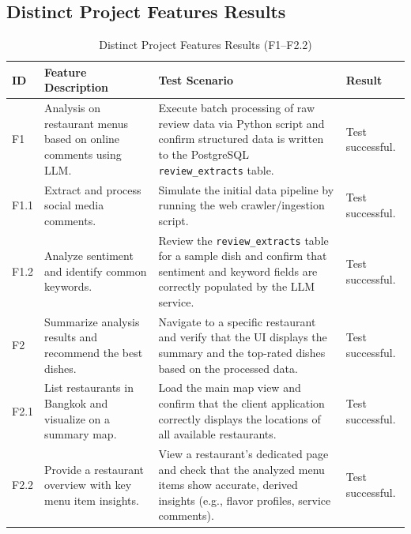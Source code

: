\subsection{Distinct Project Features Results}
\begin{table}[H]
	\centering
	\caption{Distinct Project Features Results (F1--F2.2)}
	\label{tab:distinct-features-results}
	{\small\setlength{\tabcolsep}{4pt}
	\begin{tabularx}{\textwidth}{@{}l p{} >{\raggedright\arraybackslash}X l@{}}
		\toprule
		\textbf{ID} & \textbf{Feature Description} & \textbf{Test Scenario} & \textbf{Result} \\
		\midrule
		F1 & Analysis on restaurant menus based on online comments using LLM. & Execute batch processing of raw review data via Python script and confirm structured data is written to the PostgreSQL \texttt{review\_extracts} table. & Test successful. \\
		F1.1 & Extract and process social media comments. & Simulate the initial data pipeline by running the web crawler/ingestion script. & Test successful. \\
		F1.2 & Analyze sentiment and identify common keywords. & Review the \texttt{review\_extracts} table for a sample dish and confirm that sentiment and keyword fields are correctly populated by the LLM service. & Test successful. \\
		F2 & Summarize analysis results and recommend the best dishes. & Navigate to a specific restaurant and verify that the UI displays the summary and the top-rated dishes based on the processed data. & Test successful. \\
		F2.1 & List restaurants in Bangkok and visualize on a summary map. & Load the main map view and confirm that the client application correctly displays the locations of all available restaurants. & Test successful. \\
		F2.2 & Provide a restaurant overview with key menu item insights. & View a restaurant's dedicated page and check that the analyzed menu items show accurate, derived insights (e.g., flavor profiles, service comments). & Test successful. \\
		\bottomrule
	\end{tabularx}}
\end{table}

